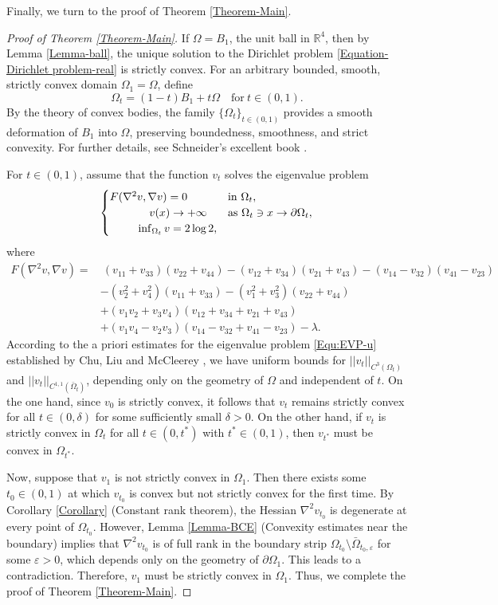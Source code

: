 \documentclass[11pt]{amsart}
\numberwithin{theorem}{section}
\numberwithin{equation}{section}
\begin{document}
Finally, we turn to the proof of Theorem \ref{Theorem-Main}.
\begin{proof}[Proof of Theorem \ref{Theorem-Main}]
If $\Omega=B_1$, the unit ball in $\mathbb{R}^4$, then by Lemma \ref{Lemma-ball}, the unique solution to the Dirichlet problem \eqref{Equation-Dirichlet problem-real} is strictly convex. For an arbitrary bounded, smooth, strictly convex domain $\Omega_1=\Omega$, define $$\Omega_t=(1-t)B_1+t\Omega\quad \mathrm{for}\ t\in(0, 1). $$ By the theory of convex bodies, the family $\{\Omega_t\}_{t\in(0, 1)}$ provides a smooth deformation of $B_1$ into $\Omega$, preserving boundedness, smoothness, and strict convexity. For further details, see Schneider's excellent book \cite{Schneider2014}.
 
For $t\in(0,1)$, assume that the function $v_t$ solves the eigenvalue problem
$$\begin{cases}
F(\nabla^2v, \nabla v)=0 & \mathrm{in}\ \Omega_t, \\
\hspace{1.25cm}v(x)\rightarrow+\infty & \mathrm{as}\ \Omega_t\ni x\rightarrow\partial\Omega_t, \\
\hspace{0.9cm}\inf_{\Omega_t}v=2\log2,
\end{cases}$$ where
\begin{align*}
F(\nabla^2v, \nabla v) =&~(v_{11}+v_{33})(v_{22}+v_{44})-(v_{12}+v_{34})(v_{21}+v_{43})-(v_{14}-v_{32})(v_{41}-v_{23})\\
&-(v_2^2+v_4^2)(v_{11}+v_{33})-(v_1^2+v_3^2)(v_{22}+v_{44})\\
&+(v_1v_2+v_3v_4)(v_{12}+v_{34}+v_{21}+v_{43})\\
&+(v_1v_4-v_2v_3)(v_{14}-v_{32}+v_{41}-v_{23})-\lambda.
\end{align*}
According to the a priori estimates for the eigenvalue problem \eqref{Equ:EVP-u} established by Chu, Liu and McCleerey \cite{Chu-Liu-McCleerey-arXiv2024}, we have uniform bounds for $||v_t||_{C^3(\Omega_t)}$ and $||v_t||_{C^{1, 1}(\bar\Omega_t)}$, depending only on the geometry of $\Omega$ and independent of $t$. On the one hand, since $v_0$ is strictly convex, it follows that $v_t$ remains strictly convex for all $t\in(0, \delta)$ for some sufficiently small $\delta>0$. On the other hand, if $v_t$ is strictly convex in $\Omega_t$ for all $t\in(0, t^\ast)$ with $t^\ast\in(0, 1)$, then $v_{t^\ast}$ must be convex in $\Omega_{t^\ast}$.
 
Now, suppose that $v_1$ is not strictly convex in $\Omega_1$. Then there exists some $t_0\in(0, 1)$ at which $v_{t_0}$ is convex but not strictly convex for the first time. By Corollary \ref{Corollary} (Constant rank theorem), the Hessian $\nabla^2v_{t_0}$ is degenerate at every point of $\Omega_{t_0}$. However, Lemma \ref{Lemma-BCE} (Convexity estimates near the boundary) implies that $\nabla^2v_{t_0}$ is of full rank in the boundary strip $\Omega_{t_0}\setminus\bar{\Omega}_{t_0, \varepsilon}$ for some $\varepsilon>0$, which depends only on the geometry of $\partial\Omega_1$. This leads to a contradiction. Therefore, $v_1$ must be strictly convex in $\Omega_1$. Thus, we complete the proof of Theorem \ref{Theorem-Main}.
\end{proof}




\end{document}

